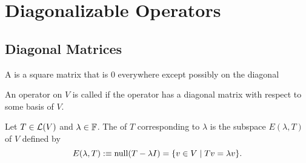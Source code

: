 \section{Diagonalizable Operators}
\subsection{Diagonal Matrices}

\setcounter{thm}{47}
\begin{mydef} 
  A  is a square matrix that is $0$ everywhere except possibly on \nopagebreak the diagonal
\end{mydef}

\setcounter{thm}{49}
\begin{mydef} [diagonalizable]
  An operator on $V$ is called  if the operator has a diagonal matrix with respect to some basis of $V$.
\end{mydef}

\setcounter{thm}{51}
\label{eigenspace}
\begin{mydef} 
  Let $T \in \mathcal{L}(V)$ and $\lambda \in \mathbb{F}$. The  of $T$ corresponding to $\lambda$ is the subspace $E(\lambda, T)$ of $V$ defined by
  \begin{equation}
    E(\lambda, T) :\equiv  \operatorname{null}(T-\lambda I) = \{ v\in V \mid Tv = \lambda v\}.
  \end{equation}
\end{mydef}


